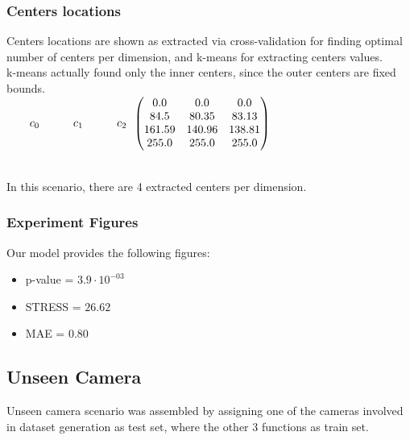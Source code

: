 		\subsubsection{Centers locations}
		
		Centers locations are shown as extracted via cross-validation for finding optimal number of centers per dimension, and k-means for extracting centers values. \\
		k-means actually found only the inner centers, since the outer centers are fixed bounds.\\
		
		$\begin{matrix}  \qquad  c_0 \quad  \qquad c_1 \quad  \qquad c_2 \end{matrix}\\
				
		
		\begin{pmatrix}
				     0.0 &     0.0 &    0.0\\
					84.5 &   80.35 &    83.13 \\
					161.59 &   140.96 &   138.81\\
		     		 255.0 &  255.0 &   255.0 \\
				\end{pmatrix}$\\
$ $

		In this scenario, there are 4 extracted centers per dimension.

	\subsubsection{Experiment Figures}
	
	Our model provides the following figures:

	\begin{itemize}
	\item 	p-value = $3.9 \cdot 10 ^{-03}$
	\item 	STRESS = $26.62$
	\item 	MAE = $0.80$
	
	\end{itemize}


\subsection{Unseen Camera}

Unseen camera scenario was assembled by assigning one of the cameras involved in dataset generation as test set, where the other 3 functions as train set.


